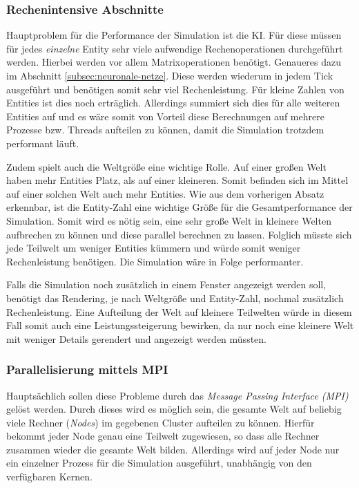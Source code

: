 \documentclass[course=erap]{aspdoc}
\begin{document}
\subsubsection{Rechenintensive Abschnitte}
Hauptproblem für die Performance der Simulation ist die KI. Für diese müssen für jedes \emph{einzelne} Entity sehr viele aufwendige Rechenoperationen durchgeführt werden. Hierbei werden vor allem Matrixoperationen benötigt. Genaueres dazu im Abschnitt \ref{subsec:neuronale-netze}. Diese werden wiederum in jedem Tick ausgeführt und benötigen somit sehr viel Rechenleistung. Für kleine Zahlen von Entities ist dies noch erträglich. Allerdings summiert sich dies für alle weiteren Entities auf und es wäre somit von Vorteil diese Berechnungen auf mehrere Prozesse bzw. Threads aufteilen zu können, damit die Simulation trotzdem performant läuft.

Zudem spielt auch die Weltgröße eine wichtige Rolle. Auf einer großen Welt haben mehr Entities Platz, als auf einer kleineren. Somit befinden sich im Mittel auf einer solchen Welt auch mehr Entities. Wie aus dem vorherigen Absatz erkennbar, ist die Entity-Zahl eine wichtige Größe für die Gesamtperformance der Simulation. Somit wird es nötig sein, eine sehr große Welt in kleinere Welten aufbrechen zu können und diese parallel berechnen zu lassen. Folglich müsste sich jede Teilwelt um weniger Entities kümmern und würde somit weniger Rechenleistung benötigen. Die Simulation wäre in Folge performanter.

Falls die Simulation noch zusätzlich in einem Fenster angezeigt werden soll, benötigt das Rendering, je nach Weltgröße und Entity-Zahl, nochmal zusätzlich Rechenleistung. Eine Aufteilung der Welt auf kleinere Teilwelten würde in diesem Fall somit auch eine Leistungssteigerung bewirken, da nur noch eine kleinere Welt mit weniger Details gerendert und angezeigt werden müssten.


\subsubsection{Parallelisierung mittels MPI}
Hauptsächlich sollen diese Probleme durch das \emph{Message Passing Interface (MPI)} gelöst werden. Durch dieses wird es möglich sein, die gesamte Welt auf beliebig viele Rechner (\emph{Nodes}) im gegebenen Cluster aufteilen zu können. Hierfür bekommt jeder Node genau eine Teilwelt zugewiesen, so dass alle Rechner zusammen wieder die gesamte Welt bilden. Allerdings wird auf jeder Node nur ein einzelner Prozess für die Simulation ausgeführt, unabhängig von den verfügbaren Kernen.
\end{document}
